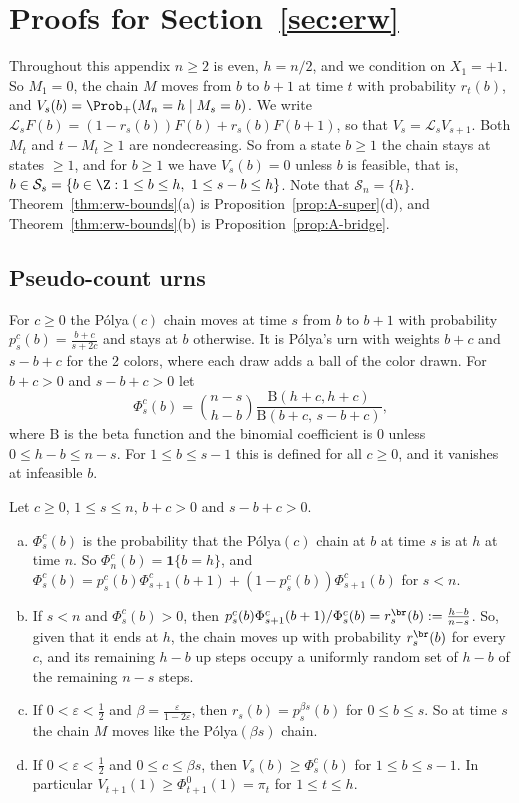 \section{Proofs for \texorpdfstring{Section~\ref{sec:erw}}{Section 2}}\label{app:erw}

Throughout this appendix $n\ge2$ is even, $h=n/2$, and we condition on
$X_1=+1$. So $M_1=0$, the chain $M$ moves from $b$ to $b+1$ at time $t$ with
probability $r_t(b)$, and $V_s(b)=\Prob_+(M_n=h\mid M_s=b)$. We write
$\mathcal L_sF(b)=(1-r_s(b))F(b)+r_s(b)F(b+1)$, so that
$V_s=\mathcal L_sV_{s+1}$. Both $M_t$ and $t-M_t\ge1$ are nondecreasing. So
from a state $b\ge1$ the chain stays at states $\ge1$, and for $b\ge1$ we
have $V_s(b)=0$ unless $b$ is feasible, that is,
$b\in\mathcal S_s=\{b\in\Z:1\le b\le h,\ 1\le s-b\le h\}$. Note that
$\mathcal S_n=\{h\}$. Theorem~\ref{thm:erw-bounds}(a) is
Proposition~\ref{prop:A-super}(d), and Theorem~\ref{thm:erw-bounds}(b) is
Proposition~\ref{prop:A-bridge}.

\subsection{Pseudo-count urns}\label{app:erw-urns}

For $c\ge0$ the P\'olya$(c)$ chain moves at time $s$ from $b$ to $b+1$ with
probability $p^c_s(b)=\frac{b+c}{s+2c}$ and stays at $b$ otherwise. It is
P\'olya's urn with weights $b+c$ and $s-b+c$ for the 2 colors, where each
draw adds a ball of the color drawn. For $b+c>0$ and $s-b+c>0$ let
\[
 \Phi^c_s(b)=\binom{n-s}{h-b}\frac{\mathrm B(h+c,h+c)}{\mathrm B(b+c,\,s-b+c)},
\]
where $\mathrm B$ is the beta function and the binomial coefficient is 0 unless
$0\le h-b\le n-s$. For $1\le b\le s-1$ this is defined for all $c\ge0$, and
it vanishes at infeasible $b$.

\begin{lemma}\label{lem:A-polya}
Let $c\ge0$, $1\le s\le n$, $b+c>0$ and $s-b+c>0$.
\begin{enumerate}[(a)]
\item $\Phi^c_s(b)$ is the probability that the P\'olya$(c)$ chain at $b$ at
time $s$ is at $h$ at time $n$. So $\Phi^c_n(b)=\mathbf 1\{b=h\}$, and
$\Phi^c_s(b)=p^c_s(b)\Phi^c_{s+1}(b+1)+(1-p^c_s(b))\Phi^c_{s+1}(b)$ for
$s<n$.
\item If $s<n$ and $\Phi^c_s(b)>0$, then
$p^c_s(b)\Phi^c_{s+1}(b+1)/\Phi^c_s(b)=r^{\br}_s(b):=\frac{h-b}{n-s}$. So,
given that it ends at $h$, the chain moves up with probability
$r^{\br}_s(b)$ for every $c$, and its remaining $h-b$ up steps occupy a
uniformly random set of $h-b$ of the remaining $n-s$ steps.
\item If $0<\varepsilon<\frac12$ and $\beta=\frac{\varepsilon}{1-2\varepsilon}$,
then $r_s(b)=p^{\beta s}_s(b)$ for $0\le b\le s$. So at time $s$ the chain
$M$ moves like the P\'olya$(\beta s)$ chain.
\item If $0<\varepsilon<\frac12$ and $0\le c\le\beta s$, then
$V_s(b)\ge\Phi^c_s(b)$ for $1\le b\le s-1$. In particular
$V_{t+1}(1)\ge\Phi^0_{t+1}(1)=\pi_t$ for $1\le t\le h$.
\end{enumerate}
\end{lemma}

